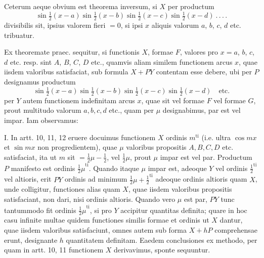 Ceterum aeque obvium est theorema inversum, si $X$ per productum
\[
\sin\tfrac12(x-a)\sin\tfrac12(x-b)\sin\tfrac12(x-c)\sin\tfrac12(x-d)\ .\,.\,.\,.
\]
divisibilis sit, ipsius valorem fieri $=0$, si ipsi $x$ aliquis valorum $a$, $b$, $c$, $d$ etc. tribuatur.

Ex theoremate praec. sequitur, si functionis $X$, formae $F$, valores pro $x=a$, $b$, $c$, $d$ etc. resp. sint $A$, $B$, $C$, $D$ etc., quamvis aliam similem functionem arcus $x$, quae iisdem valoribus satisfaciat, sub formula $X+PY$ contentam esse debere, ubi per $P$ designamus productum
\[
\sin\tfrac12(x-a)\sin\tfrac12(x-b)\sin\tfrac12(x-c)\sin\tfrac12(x-d)\quad\text{etc.}
\]
per $Y$ autem functionem indefinitam arcus $x$, quae sit vel formae $F$ vel formae
\(G\), prout multitudo valorum \(a,b,c,d\) etc., quam per \(\mu\) designabimus, par est vel impar. Iam observamus:

I. In artt. 10, 11, 12 eruere docuimus functionem \(X\) ordinis \(m^{\mathrm{ti}}\) (i.e. ultra \(\cos mx\) et \(\sin mx\) non progredientem), quae \(\mu\) valoribus propositis \(A,B,C,D\) etc. satisfaciat, ita ut \(m\) sit \(=\frac{1}{2}\mu-\frac{1}{2}\), vel \(\frac{1}{2}\mu\), prout \(\mu\) impar est vel par. Productum \(P\) manifesto est ordinis \({\frac{1}{2}\mu}^{\mathrm{ti}}\). Quando itaque \(\mu\) impar est, adeoque \(Y\) vel ordinis \({\frac{1}{2}}^{\mathrm{ti}}\) vel altioris, erit \(PY\) ordinis ad minimum \({\frac{1}{2}\mu+\frac{1}{2}}^{\mathrm{ti}}\) adeoque ordinis altioris quam \(X\), unde colligitur, functiones alias quam \(X\), quae iisdem valoribus propositis satisfaciant, non dari, nisi ordinis altioris. Quando vero \(\mu\) est par, \(PY\) tunc tantummodo fit ordinis \({\frac{1}{2}\mu}^{\mathrm{ti}}\), si pro \(Y\) accipitur quantitas definita; quare in hoc casu infinite multae quidem functiones similis formae et ordinis ut \(X\) dantur, quae iisdem valoribus satisfaciunt, omnes autem sub forma \(X+hP\) comprehensae erunt, designante \(h\) quantitatem definitam. Eaedem conclusiones ex methodo, per quam in artt. 10, 11 functionem \(X\) derivavimus, sponte sequuntur.

